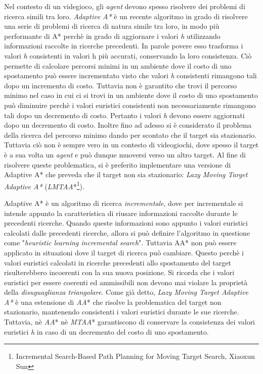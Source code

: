 \documentclass[11pt]{article}
\begin{document}
\par{Nel contesto di un videgioco, gli \emph{agent} devono spesso risolvere dei problemi di ricerca simili tra loro. \emph{Adaptive A*} \`e un recente algoritmo in grado di risolvere una serie di problemi di ricerca di natura simile tra loro, in modo pi\`u performante di A* perch\`e in grado di aggiornare i valori \emph{h} utilizzando informazioni raccolte in ricerche precedenti. In parole povere esso trasforma i valori \emph{h} consistenti in valori h pi\`u accurati, conservando la loro consistenza. Ci\`o permette di calcolare percorsi minimi in un ambiente dove il costo di uno spostamento pu\`o essere incrementato visto che valori \emph{h} consistenti rimangono tali dopo un incremento di costo. Tuttavia non \`e garantito che trovi il percorso minimo nel caso in cui ci si trovi in un ambiente dove il costo di uno spostamento pu\`o diminuire perch\`e i valori euristici consistenti non necessariamente rimangono tali dopo un decremento di costo. Pertanto i valori \emph{h} devono essere aggiornati dopo un decremento di costo. Inoltre fino ad adesso si \`e considerato il problema della ricerca del percorso minimo dando per scontato che il target sia stazionario. Tuttavia ci\`o non \`e sempre vero in un contesto di videogiochi, dove spesso il target \`e a sua volta un \emph{agent} e pu\`o dunque muoversi verso un altro target. Al fine di risolvere queste problematica, si \`e preferito implementare una versione di Adaptive A* che preveda che il target non sia stazionario: \emph{Lazy Moving Target Adaptive A*} (\emph{LMTAA}*\footnote{Incremental Search-Based Path Planning for Moving Target Search, Xiaoxun Sun}).}

\par{Adaptive A* \`e un algoritmo  di ricerca \emph{incrementale}, dove per incrementale si intende appunto la caratteristica di riusare informazioni raccolte durante le precedenti ricerche. Quando queste informazioni sono appunto i valori euristici calcolati dalle precedenti ricerche, allora si pu\`o definire l'algoritmo in questione come "\emph{heuristic learning incremental search}". Tuttavia AA* non pu\`o essere applicato in situazioni dove il target di ricerca pu\`o cambiare. Questo perch\`e i valori euristici calcolati in ricerche precedenti allo spostamento del target risulterebbero incoerenti con la sua nuova posizione. Si ricorda che i valori euristici per essere coerenti ed ammissibili non devono mai violare la propriet\`a della \emph{disuguaglianza triangolare}.  Come gi\`a detto, \emph{Lazy Moving Target Adaptive A*} \`e una estensione di \emph{AA}* che risolve la problematica del target non stazionario, mantenendo consistenti i valori euristici durante le sue ricerche. Tuttavia, n\`e \emph{AA}* n\`e \emph{MTAA}* garantiscono di conservare la consistenza dei valori euristici \emph{h} in caso di un decremento del costo di uno spostamento.}
\end{document}
